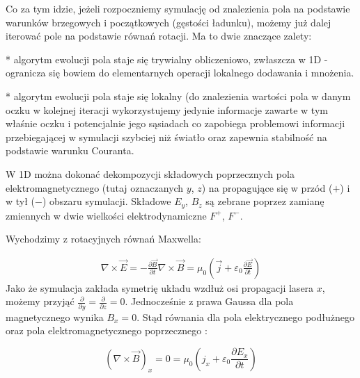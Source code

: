     Co za tym idzie, jeżeli rozpoczniemy symulację od znalezienia pola na
    podstawie warunków brzegowych i początkowych (gęstości ładunku), możemy już
    dalej iterować pole na podstawie równań rotacji. Ma to dwie znaczące
    zalety:

    * algorytm ewolucji pola staje się trywialny obliczeniowo,
    zwłaszcza w 1D - ogranicza się bowiem do elementarnych operacji lokalnego
    dodawania i mnożenia.

    * algorytm ewolucji pola staje się lokalny (do
    znalezienia wartości pola w danym oczku w kolejnej iteracji wykorzystujemy
    jedynie informacje zawarte w tym właśnie oczku i potencjalnie jego
    sąsiadach  co zapobiega
    problemowi informacji przebiegającej w symulacji szybciej niż światło oraz
    zapewnia stabilność na podstawie
    warunku Couranta.

    W 1D można dokonać dekompozycji składowych poprzecznych pola
    elektromagnetycznego (tutaj oznaczanych $y$, $z$) na propagujące się w
    przód ($+$) i w tył ($-$) obszaru symulacji. Składowe $E_y$, $B_z$ są
    zebrane poprzez zamianę zmiennych w dwie wielkości elektrodynamiczne $F^+$,
    $F^-$.

    Wychodzimy z rotacyjnych równań Maxwella:

    \begin{align}
        \nabla \times \vec{E} = -\frac{\partial \vec{B}}{\partial t}
        \nabla \times \vec{B} = \mu_0 (\vec{j} + \varepsilon_0 \frac{\partial \vec{E}}{\partial t})
        \label{eqn:Maxwell-rotation-derivation}
     \end{align}
    Jako że symulacja zakłada symetrię układu wzdłuż osi propagacji lasera $x$,
    możemy przyjąć $\frac{\partial}{\partial y} = \frac{\partial}{\partial z} =
    0 $.  Jednocześnie z prawa Gaussa dla pola magnetycznego wynika $B_x = 0$.
    Stąd równania dla pola elektrycznego podłużnego oraz pola
    elektromagnetycznego poprzecznego :

    \begin{equation}
        (\nabla \times \vec{B})_x = 0 = \mu_0 (j_x + \varepsilon_0 \frac{\partial E_x}{\partial t})
        \label{eqn:longitudinal-field-eq}
     \end{equation}

